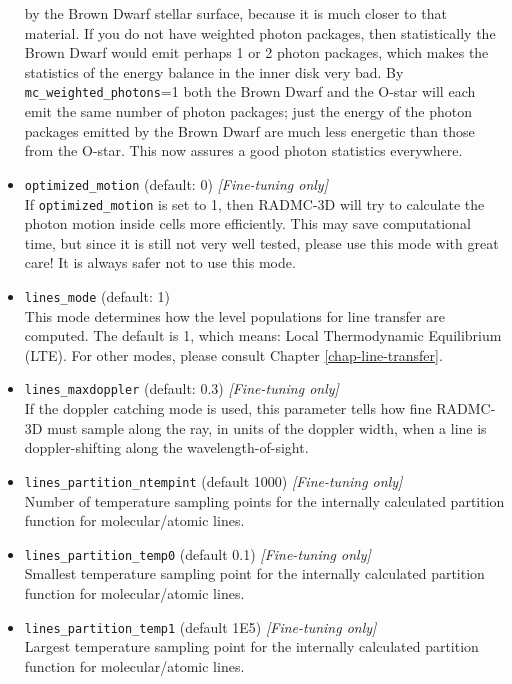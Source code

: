 \documentclass{report}
\begin{document}
\begin{itemize}
  by the Brown Dwarf stellar surface, because it is much closer to that
  material. If you do not have weighted photon packages, then statistically
  the Brown Dwarf would emit perhaps 1 or 2 photon packages, which makes the
  statistics of the energy balance in the inner disk very bad. By {\small\tt
    mc\_weighted\_photons}=1 both the Brown Dwarf and the O-star will each
  emit the same number of photon packages; just the energy of the photon
  packages emitted by the Brown Dwarf are much less energetic than those
  from the O-star.  This now assures a good photon statistics everywhere.
\item {\small\tt optimized\_motion} (default: 0) {\em [Fine-tuning only]}\\
  If {\small\tt optimized\_motion} is set to 1, then RADMC-3D will try to 
  calculate the photon motion inside cells more efficiently. This may
  save computational time, but since it is still not very well tested,
  please use this mode with great care! It is always safer not to use
  this mode.
\item {\small\tt lines\_mode} (default: 1)\\
  This mode determines how the level populations for line transfer are
  computed. The default is 1, which means: Local Thermodynamic Equilibrium
  (LTE). For other modes, please consult Chapter \ref{chap-line-transfer}.
\item {\small\tt lines\_maxdoppler} (default: 0.3) {\em [Fine-tuning only]}\\
  If the doppler catching mode is used, this parameter tells how fine RADMC-3D
  must sample along the ray, in units of the doppler width, when a line is
  doppler-shifting along the wavelength-of-sight.
\item {\small\tt lines\_partition\_ntempint} (default 1000) {\em [Fine-tuning only]}\\
  Number of temperature sampling points for the internally calculated
  partition function for molecular/atomic lines.
\item {\small\tt lines\_partition\_temp0} (default 0.1) {\em [Fine-tuning only]}\\
  Smallest temperature sampling point for the internally calculated
  partition function for molecular/atomic lines.
\item {\small\tt lines\_partition\_temp1} (default 1E5) {\em [Fine-tuning only]}\\
  Largest temperature sampling point for the internally calculated
  partition function for molecular/atomic lines.

\end{itemize}
\end{document}
